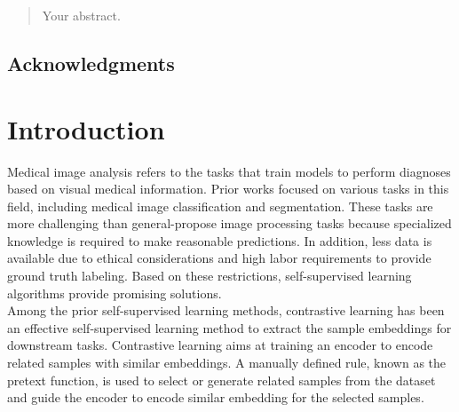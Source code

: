 \documentclass[12pt,twoside]{report}
\begin{document}



\clearpage{\pagestyle{empty}\cleardoublepage}
\setcounter{page}{1}
\pagestyle{fancy}

\begin{abstract}
Your abstract.
\end{abstract}

\section*{Acknowledgments}


\tableofcontents 


\setcounter{page}{1}
\fancyhead[LE,RO]{\slshape \rightmark}
\fancyhead[LO,RE]{\slshape \leftmark}

\chapter{Introduction}

Medical image analysis refers to the tasks that train models to perform diagnoses based on visual medical information. Prior works focused on various tasks in this field, including medical image classification and segmentation. These tasks are more challenging than general-propose image processing tasks because specialized knowledge is required to make reasonable predictions. In addition, less data is available due to ethical considerations and high labor requirements to provide ground truth labeling. Based on these restrictions, self-supervised learning algorithms provide promising solutions. \\

Among the prior self-supervised learning methods, contrastive learning has been an effective self-supervised learning method to extract the sample embeddings for downstream tasks. Contrastive learning aims at training an encoder to encode related samples with similar embeddings. A manually defined rule, known as the pretext function, is used to select or generate related samples from the dataset and guide the encoder to encode similar embedding for the selected samples. \\
\end{document}
